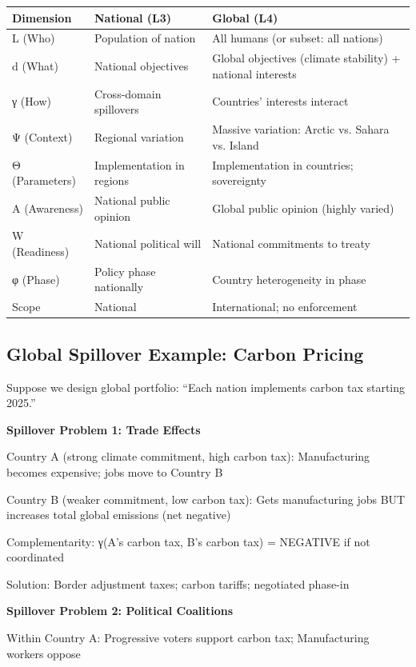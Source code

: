 \begin{center}
\begin{tabular}{@{}lll@{}}
\toprule
\textbf{Dimension} & \textbf{National (L3)} & \textbf{Global (L4)} \\
\midrule
L (Who) & Population of nation & All humans (or subset: all nations) \\
d (What) & National objectives & Global objectives (climate stability) + national interests \\
γ (How) & Cross-domain spillovers & Countries' interests interact \\
Ψ (Context) & Regional variation & Massive variation: Arctic vs. Sahara vs. Island \\
Θ (Parameters) & Implementation in regions & Implementation in countries; sovereignty \\
A (Awareness) & National public opinion & Global public opinion (highly varied) \\
W (Readiness) & National political will & National commitments to treaty \\
φ (Phase) & Policy phase nationally & Country heterogeneity in phase \\
Scope & National & International; no enforcement \\
\midrule
\end{tabular}
\end{center}

\subsection{Global Spillover Example: Carbon Pricing}

Suppose we design global portfolio: ``Each nation implements carbon tax starting 2025.''

\textbf{Spillover Problem 1: Trade Effects}

Country A (strong climate commitment, high carbon tax): Manufacturing becomes expensive; jobs move to Country B

Country B (weaker commitment, low carbon tax): Gets manufacturing jobs BUT increases total global emissions (net negative)

Complementarity: γ(A's carbon tax, B's carbon tax) = NEGATIVE if not coordinated

Solution: Border adjustment taxes; carbon tariffs; negotiated phase-in

\textbf{Spillover Problem 2: Political Coalitions}

Within Country A: Progressive voters support carbon tax; Manufacturing workers oppose

